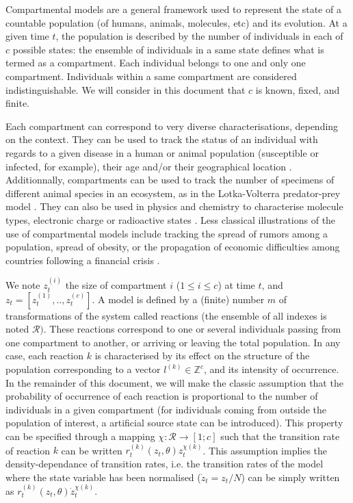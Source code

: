 \documentclass[a4paper,11pt,titlepage]{article}
\theoremstyle{plain} %
\begin{document}
Compartmental models are a general framework used to represent the state of a countable population (of humans, animals, molecules, etc) and its evolution. At a given time $t$, the population is described by the number of individuals in each of $c$ possible states: the ensemble of individuals in a same state defines what is termed as a compartment. Each individual belongs to one and only one compartment. Individuals within a same compartment are considered indistinguishable. We will consider in this document that $c$ is known, fixed, and finite. 

Each compartment can correspond to very diverse characterisations, depending on the context. They can be used to track the status of an individual with regards to a given disease in a human or animal population (susceptible or infected, for example), their age and/or their geographical location \citep{Anderson1992}. Additionnally, compartments can be used to track the number of specimens of different animal species in an ecosystem, as in the Lotka-Volterra predator-prey model \citep{Pulliam1988}. They can also be used in physics and chemistry to characterise molecule types, electronic charge or radioactive states \citep{Nagashima1968,Zanzonico2000}. Less classical illustrations of the use of compartmental models include tracking the spread of rumors among a population,  spread of obesity, or the propagation of economic difficulties among countries following a financial crisis \citep{Morris1993,Demiris2012}.

We note $z^{(i)}_t$ the size of compartment $i$ ($1\leq i \leq c$) at time $t$, and $z_t=[z_t^{(1)},..,z_t^{(c)}]$. A model is defined by a (finite) number $m$ of transformations of the system called reactions (the ensemble of all indexes is noted $\mathcal{R})$. These reactions correspond to one or several individuals passing from one compartment to another, or arriving or leaving the total population. In any case, each reaction $k$ is characterised by its effect on the structure of the population corresponding to a vector $l^{(k)}\in\mathbb{Z}^c$, and its intensity of occurrence. In the remainder of this document, we will make the classic assumption that the probability of occurrence of each reaction is proportional to the number of individuals in a given compartment (for individuals coming from outside the population of interest, a artificial source state can be introduced). This property can be specified through a mapping $\chi:\mathcal{R}\rightarrow [1;c]$ such that the transition rate of reaction $k$ can be written $r^{(k)}_t(z_t,\theta) z^{\chi(k)}_t$. This assumption implies the density-dependance of transition rates, i.e. the transition rates of the model where the state variable has been normalised ($\dot{z}_t=z_t/N$) can be simply written as $r^{(k)}_t(z_t,\theta) \dot{z}^{\chi(k)}_t$.
\end{document}
